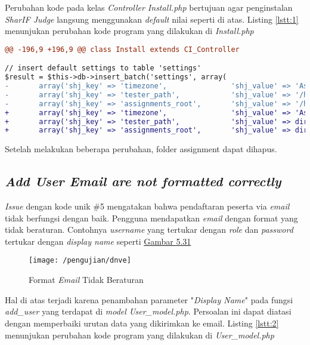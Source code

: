 	Perubahan kode pada kelas \textit{Controller Install.php} bertujuan agar penginstalan \textit{SharIF Judge} langsung menggunakan \textit{default} nilai seperti di atas. Listing \ref{lstt:1} menunjukan perubahan kode program yang dilakukan di \textit{Install.php}
	
\begin{lstlisting}[language=diff, caption=Perubahan kode program pada \textit{Install.php}, label=lstt:1,basicstyle=\ttfamily, frame=single,
columns=fullflexible, keepspaces=true, breaklines=true]
@@ -196,9 +196,9 @@ class Install extends CI_Controller

// insert default settings to table 'settings'
$result = $this->db->insert_batch('settings', array(
-   	array('shj_key' => 'timezone',               'shj_value' => 'Asia/Tehran'),
-       array('shj_key' => 'tester_path',            'shj_value' => '/home/shj/tester'),
-       array('shj_key' => 'assignments_root',       'shj_value' => '/home/shj/assignments'),
+       array('shj_key' => 'timezone',               'shj_value' => 'Asia/Jakarta'),
+       array('shj_key' => 'tester_path',            'shj_value' => dirname(__FILE__, 3) . "/restricted/tester"),
+       array('shj_key' => 'assignments_root',       'shj_value' => dirname(__FILE__, 3) . "/restricted/assignments"),
\end{lstlisting}
	Setelah melakukan beberapa perubahan, folder assignment dapat dihapus.
	
	\subsection{\textit{Add User Email are not formatted correctly}}
	\textit{Issue} dengan kode unik \#5 mengatakan bahwa pendaftaran peserta via \textit{email} tidak berfungsi dengan baik. Pengguna mendapatkan \textit{email} dengan format yang tidak beraturan. Contohnya \textit{username} yang tertukar dengan \textit{role} dan \textit{password} tertukar dengan \textit{display name} seperti \hyperref[fig:dnve]{Gambar 5.31} 
	\begin{figure}[H]
		\centering  
		\texttt{[image: /pengujian/dnve]}  
		\caption[Format \textit{Email} Tidak Beraturan]{Format \textit{Email} Tidak Beraturan} 
		\label{fig:dnve} 
	\end{figure}

	Hal di atas terjadi karena penambahan parameter "\textit{Display Name}" pada fungsi \textit{add\_user} yang terdapat di \textit{model User\_model.php}. Persoalan ini dapat diatasi dengan memperbaiki urutan data yang dikirimkan ke email. Listing \ref{lstt:2} menunjukan perubahan kode program yang dilakukan di \textit{User\_model.php}
	

